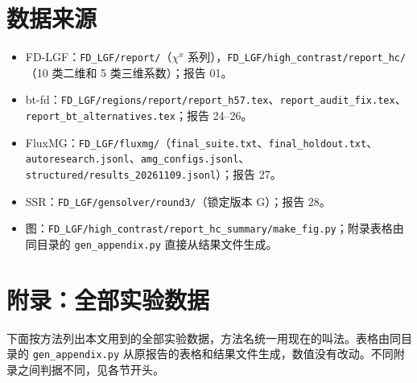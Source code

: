 \documentclass[11pt,a4paper]{ctexart}
\begin{document}
\section{数据来源}\label{sec:files}
\begin{itemize}
\item FD-LGF：\texttt{FD\_LGF/report/}（$\chi^x$ 系列），\texttt{FD\_LGF/high\_contrast/report\_hc/}（10 类二维和 5 类三维系数）；报告 01。
\item bt-fd：\texttt{FD\_LGF/regions/report/report\_h57.tex}、\texttt{report\_audit\_fix.tex}、\texttt{report\_bt\_alternatives.tex}；报告 24--26。
\item FluxMG：\texttt{FD\_LGF/fluxmg/}（\texttt{final\_suite.txt}、\texttt{final\_holdout.txt}、\texttt{autoresearch.jsonl}、\texttt{amg\_configs.jsonl}、\texttt{structured/results\_20261109.jsonl}）；报告 27。
\item SSR：\texttt{FD\_LGF/gensolver/round3/}（锁定版本 G）；报告 28。
\item 图：\texttt{FD\_LGF/high\_contrast/report\_hc\_summary/make\_fig.py}；附录表格由同目录的 \texttt{gen\_appendix.py} 直接从结果文件生成。
\end{itemize}

\clearpage
{}
\appendix
\section*{附录：全部实验数据}
下面按方法列出本文用到的全部实验数据，方法名统一用现在的叫法。表格由同目录的 \texttt{gen\_appendix.py} 从原报告的表格和结果文件生成，数值没有改动。不同附录之间判据不同，见各节开头。

\end{document}
